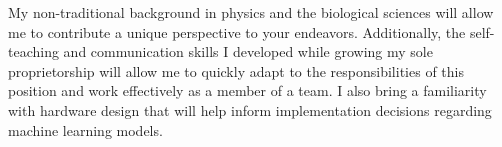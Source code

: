 \begin{cvletter}

	My non-traditional background in physics and the biological sciences
	will allow me to contribute a unique perspective to your endeavors.
	Additionally, the self-teaching and communication skills I developed
	while growing my sole proprietorship will allow me to quickly adapt
	to the responsibilities of this position and work effectively
	as a member of a team. I also bring a familiarity with hardware
	design that will help inform implementation decisions regarding
	machine learning models.

\end{cvletter}

